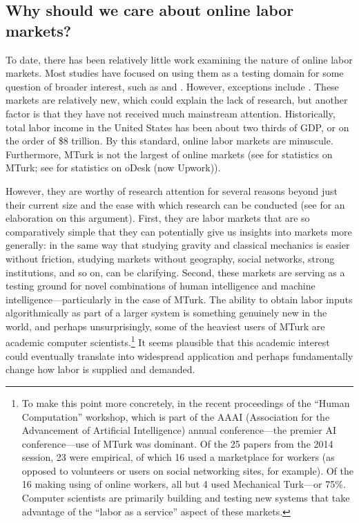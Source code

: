 \documentclass[11pt]{article}
\begin{document}
\subsection{Why should we care about online labor markets?}
To date, there has been relatively little work examining the nature of online labor markets.
Most studies have focused on using them as a testing domain for some question of broader interest, such as \cite{pallais2010inefficient} and \cite{pallais2013referential}.
However, exceptions include \cite{horton2010online, kittur2013future, horton2011condition}. 
These markets are relatively new, which could explain the lack of research, but another factor is that they have not received much mainstream attention. 
Historically, total labor income in the United States has been about two thirds of GDP, or on the order of \$8 trillion.
By this standard, online labor markets are minuscule.  
Furthermore, MTurk is not the largest of online markets (see \cite{ipeirotis2010demographics} for statistics on MTurk; see \cite{agrawal2013digitization} for statistics on oDesk (now Upwork)).

However, they are worthy of research attention for several reasons beyond just their current size and the ease with which research can be conducted (see \cite{horton2011online} for an elaboration on this argument). 
First, they are labor markets that are so comparatively simple that they can potentially give us insights into markets more generally:
in the same way that studying gravity and classical mechanics is easier without friction, studying markets without geography, social networks, strong institutions, and so on, can be clarifying.
Second, these markets are serving as a testing ground for novel combinations of human intelligence and machine intelligence---particularly in the case of MTurk.  
The ability to obtain labor inputs algorithmically as part of a larger system is something genuinely new in the world, and perhaps unsurprisingly, some of the heaviest users of MTurk are academic computer scientists.\footnote{
To make this point more concretely, in the recent proceedings of the ``Human Computation'' workshop, which is part of the AAAI (Association for the Advancement of Artificial Intelligence) annual conference---the premier AI conference---use of MTurk was dominant.  
Of the 25 papers from the 2014 session, 23 were empirical, of which 16 used a marketplace for workers (as opposed to volunteers or users on social networking sites, for example).
Of the 16 making using of online workers, all but 4 used Mechanical Turk---or 75\%.
Computer scientists are primarily building and testing new systems that take advantage of the ``labor as a service'' aspect of these markets.
}
It seems plausible that this academic interest could eventually translate into widespread application and perhaps fundamentally change how labor is supplied and demanded. 
\end{document}
